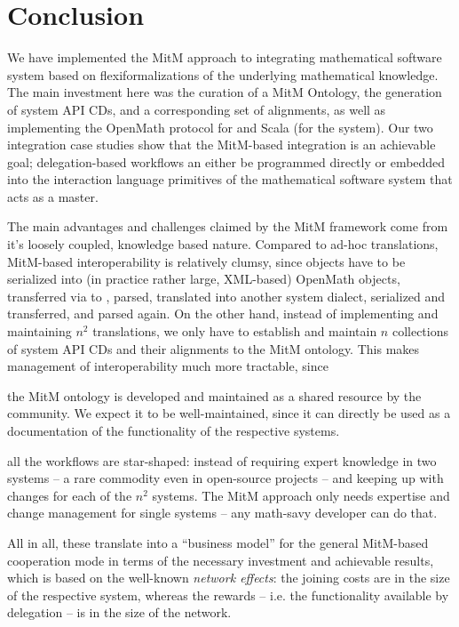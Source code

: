 \section{Conclusion}\label{sec:concl}
We have implemented the MitM approach to integrating mathematical software system based on
flexiformalizations of the underlying mathematical knowledge. The main investment here was
the curation of a MitM Ontology, the generation of system API CDs, and a corresponding set
of alignments, as well as implementing the OpenMath \SCSCP protocol for \Python and Scala
(for the \MMT system). Our two integration case studies show that the MitM-based
integration is an achievable goal; delegation-based workflows an either be programmed
directly or embedded into the interaction language primitives of the mathematical software
system that acts as a master. 

The main advantages and challenges claimed by the MitM framework come from it's loosely
coupled, knowledge based nature. Compared to ad-hoc translations, MitM-based
interoperability is relatively clumsy, since objects have to be serialized into (in
practice rather large, XML-based) OpenMath objects, transferred via \SCSCP to \MMT, parsed,
translated into another system dialect, serialized and transferred, and parsed again. On
the other hand, instead of implementing and maintaining $n^2$ translations, we only have
to establish and maintain $n$ collections of system API CDs and their alignments to the
MitM ontology. This makes management of interoperability much more tractable, since
\begin{compactenum}
\item the MitM ontology is developed and maintained as a shared
  resource by the community. We expect it to be well-maintained, since it can directly be
  used as a documentation of the functionality of the respective systems.
\item all the workflows are star-shaped: instead of requiring expert knowledge in two
  systems -- a rare commodity even in open-source projects -- and keeping up with changes
  for each of the $n^2$ systems. The MitM approach only needs expertise and change
  management for single systems -- any math-savy developer can do that.
\end{compactenum}
All in all, these translate into a ``business model'' for the general MitM-based
cooperation mode in terms of the necessary investment and achievable results, which is
based on the well-known \emph{network effects}: the joining costs are in the size of the
respective system, whereas the rewards -- i.e. the functionality available by delegation
-- is in the size of the network.

